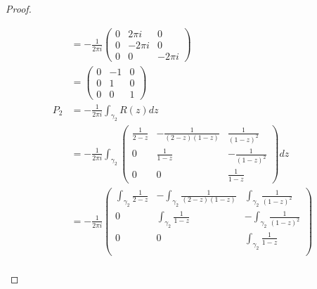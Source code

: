 \documentclass[12pt]{article}
\theoremstyle{definition}
\begin{document}
\begin{proof}
\begin{enumerate}[label=(\alph*)]
\begin{align*}
			          & = -\frac{1}{2\pi i}\begin{pmatrix}
				                               0 & 2\pi i  & 0       \\
				                               0 & -2\pi i & 0       \\
				                               0 & 0       & -2\pi i
			                               \end{pmatrix}                                                                                   \\
			          & = \begin{pmatrix}
				              0 & -1 & 0 \\
				              0 & 1  & 0 \\
				              0 & 0  & 1
			              \end{pmatrix}                                                                                                           \\
			      P_2 & = -\frac{1}{2\pi i}\int_{\gamma_2} R(z) dz                                                                                 \\
			          & = -\frac{1}{2\pi i}\int_{\gamma_2}\begin{pmatrix}
				                                              \frac{1}{2-z} & -\frac{1}{(2-z)(1-z)} & \frac{1}{(1-z)^2}  \\
				                                              0             & \frac{1}{1-z}         & -\frac{1}{(1-z)^2} \\
				                                              0             & 0                     & \frac{1}{1-z}
			                                              \end{pmatrix}dz                               \\
			          & = -\frac{1}{2\pi i}\begin{pmatrix}
				                               \int_{\gamma_2}\frac{1}{2-z} & -\int_{\gamma_2}\frac{1}{(2-z)(1-z)} & \int_{\gamma_2}\frac{1}{(1-z)^2}  \\
				                               0                            & \int_{\gamma_2}\frac{1}{1-z}         & -\int_{\gamma_2}\frac{1}{(1-z)^2} \\
				                               0                            & 0                                    & \int_{\gamma_2}\frac{1}{1-z}      \\
			                               \end{pmatrix} \\

\end{align*}
\end{enumerate}
\end{proof}
\end{document}

